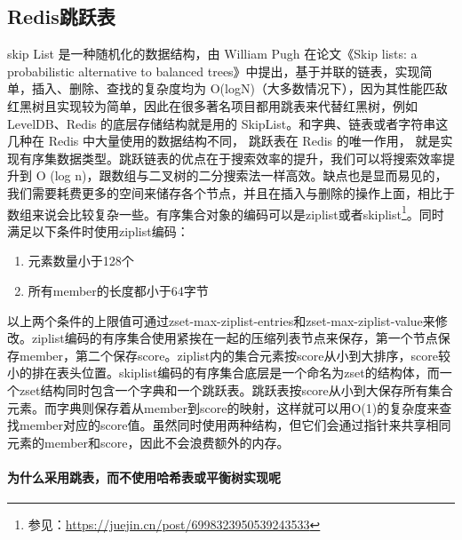 \documentclass[../../../interview-questions.tex]{subfiles}
\begin{document}
\subsection{Redis跳跃表}

skip List 是一种随机化的数据结构，由 William Pugh 在论文《Skip lists: a probabilistic alternative to balanced trees》中提出，基于并联的链表，实现简单，插入、删除、查找的复杂度均为 O(logN)（大多数情况下），因为其性能匹敌红黑树且实现较为简单，因此在很多著名项目都用跳表来代替红黑树，例如 LevelDB、Redis 的底层存储结构就是用的 SkipList。和字典、链表或者字符串这几种在 Redis 中大量使用的数据结构不同， 跳跃表在 Redis 的唯一作用， 就是实现有序集数据类型。跳跃链表的优点在于搜索效率的提升，我们可以将搜索效率提升到 O (log n)，跟数组与二叉树的二分搜索法一样高效。缺点也是显而易见的，我们需要耗费更多的空间来储存各个节点，并且在插入与删除的操作上面，相比于数组来说会比较复杂一些。有序集合对象的编码可以是ziplist或者skiplist\footnote{参见：\url{https://juejin.cn/post/6998323950539243533}}。同时满足以下条件时使用ziplist编码：

\begin{enumerate}
    \item {元素数量小于128个}
    \item {所有member的长度都小于64字节}
\end{enumerate}

以上两个条件的上限值可通过zset-max-ziplist-entries和zset-max-ziplist-value来修改。ziplist编码的有序集合使用紧挨在一起的压缩列表节点来保存，第一个节点保存member，第二个保存score。ziplist内的集合元素按score从小到大排序，score较小的排在表头位置。skiplist编码的有序集合底层是一个命名为zset的结构体，而一个zset结构同时包含一个字典和一个跳跃表。跳跃表按score从小到大保存所有集合元素。而字典则保存着从member到score的映射，这样就可以用O(1)的复杂度来查找member对应的score值。虽然同时使用两种结构，但它们会通过指针来共享相同元素的member和score，因此不会浪费额外的内存。

\paragraph{为什么采用跳表，而不使用哈希表或平衡树实现呢}
\end{document}
